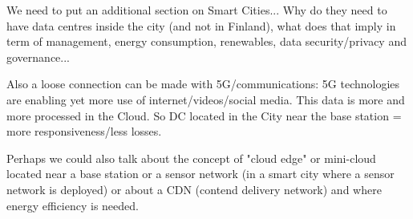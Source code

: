 We need to put an additional section on Smart Cities... Why do they need to have data centres inside the city (and not in Finland), what does that imply in term of management, energy consumption, renewables, data security/privacy and governance...

Also a loose connection can be made with 5G/communications: 5G technologies are enabling yet more use of internet/videos/social media. This data is more and more processed in the Cloud. So DC located in the City near the base station = more responsiveness/less losses.

Perhaps we could also talk about the concept of "cloud edge" or mini-cloud located near a base station or a sensor network (in a smart city where a sensor network is deployed) or about a CDN (contend delivery network) and where energy efficiency is needed.